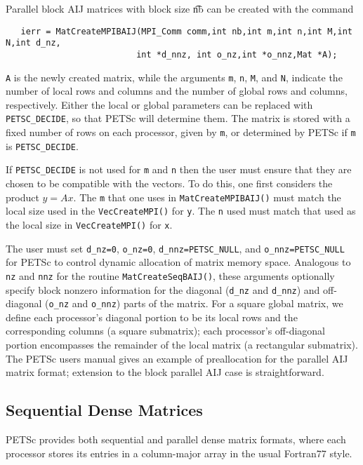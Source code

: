Parallel block AIJ matrices with block size {\t nb} can be created with
the command 
\begin{verbatim}
   ierr = MatCreateMPIBAIJ(MPI_Comm comm,int nb,int m,int n,int M,int N,int d_nz,
                          int *d_nnz, int o_nz,int *o_nnz,Mat *A);
\end{verbatim}
{\tt A} is the newly created matrix, while the arguments {\tt m}, {\tt n}, 
{\tt M}, and {\tt N}, indicate the number of local rows and columns and
the number of global rows and columns, respectively. Either the local or
global parameters can be replaced with {\tt PETSC\_DECIDE}, so that 
PETSc will determine  them.
The matrix is stored with a fixed number of rows on 
each processor, given by {\tt m}, or determined by PETSc if {\tt m} is
{\tt PETSC\_DECIDE}.

If {\tt PETSC\_DECIDE} is not used for
{\tt m} and {\tt n} then the user must ensure that they are chosen to be
compatible with the vectors. To do this, one first considers the product 
$y = A x$. The {\tt m} that one uses in {\tt MatCreateMPIBAIJ()}
must match the local size used in the {\tt VecCreateMPI()} for {\tt y}.
The {\tt n} used must match that used as the local size in 
{\tt VecCreateMPI()} for {\tt x}. 

The user must set {\tt d\_nz=0}, {\tt o\_nz=0}, {\tt d\_nnz=PETSC\_NULL}, and 
{\tt o\_nnz=PETSC\_NULL} for PETSc to control dynamic allocation of matrix
memory space.  Analogous to {\tt nz} and {\tt nnz} for the routine 
{\tt MatCreateSeqBAIJ()}, these arguments optionally specify 
block nonzero information for the diagonal ({\tt d\_nz} and {\tt d\_nnz}) and 
off-diagonal ({\tt o\_nz} and {\tt o\_nnz}) parts of the matrix. 
For a square global matrix, we define each processor's diagonal portion 
to be its local rows and the corresponding columns (a square submatrix);  
each processor's off-diagonal portion encompasses the remainder of the
local matrix (a rectangular submatrix).  
The PETSc users manual gives an example of preallocation for
the parallel AIJ matrix format; extension to the block parallel AIJ case
is straightforward.

\subsection{Sequential Dense Matrices}

PETSc provides both sequential and parallel dense matrix formats,
where each processor stores its entries in a column-major array in the
usual Fortran77 style. 

